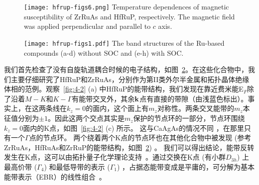 \begin{figure}[!h]
    \centering
    \texttt{[image: hfrup-figs6.png]}
    {Temperature dependences of magnetic susceptibility of ZrRuAs and HfRuP, respectively. The magnetic field was applied perpendicular and parallel to $c$ axis. ~\citep{qian2019npj}
    }\label{hfrup-fig:s6}
\end{figure}
    

\begin{figure}[!htb]
    \centering
    \texttt{[image: hfrup-figs1.pdf]}
    {The band structures  of the Ru-based compounds (a-d) without SOC and (e-h) with SOC. ~\citep{qian2019npj}
    }\label{hfrup-fig:s1}
\end{figure}
    
我们首先检查了没有自旋轨道耦合时候的电子结构，如图~\ref{hfrup-fig:s1}。在这些化合物中，我们主要仔细研究了HfRuP和ZrRuAs，分别作为第II类外尔半金属和拓扑晶体绝缘体相的范例。观察~\ref{fig:4-2} (a) 中HfRuP的能带结构，我们发现在靠近费米能E$_F$除了沿着$M-K$和$K-\Gamma$有能带交叉外，其余$\bold{k}$点有直接的带隙（由浅蓝色标出）。事实上，在这两条线在$k_z = 0$的面内，这个面上有$m_z$对称性。两条交叉能带的$m_z$本征值分别为$\pm 1$。因此这两个交点其实是$m_z$保护的节点环的一部分，节点环围绕$k_z = 0$面内的K点，如图~\ref{fig:4-2} (c) 所示。
这与CaAgAs的情况不同 \citep{yamakage2015line}，在那里只有一个$\Gamma$点的节点环。
两个绕着两个K点的节点环也在其他化合物中被发现 (参考ZrRuAs，HfRuAs和ZrRuP的能带结构，如图~\ref{hfrup-fig:s1}) 。
我们可以得出结论，能带反转发生在K点，这可以由拓扑量子化学理论支持~\citep{tqc2017,Vergniory2019}。通过交换在K点 (有小群$D_{3h}$) 上最高价带 ($\Gamma_4$) 和最低导带的表示 ($\Gamma_1$) ，占据态能带变成是平庸的，可分解为基本能带表示（EBR）的线性组合~\citep{tqc2017}。

